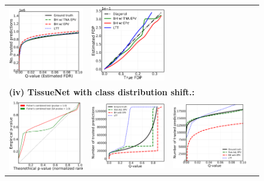 \documentclass{article}
\begin{document}
\begin{figure}[h!]
\begin{tabular}{cccc}
		\includegraphics[width=1.7in]{img/cnn_cells_segment_fdr_control_loc.png} & 
		\includegraphics[width=1.7in]{img/cnn_FDPscat_cells_segment.png}\\
		\multicolumn{4}{l}{\bf (iv) TissueNet with class distribution shift.:}\\		
		\includegraphics[width=1.7in]{img/cnn_QQ_cells_balanced01.png} &
		\includegraphics[width=1.7in]{img/cnn_cells_balanced_fdr_control01.png} & 
		\includegraphics[width=1.7in]{img/cnn_cells_balanced_fdr_control_loc01.png} & 

\end{tabular}
\end{figure}
\end{document}
